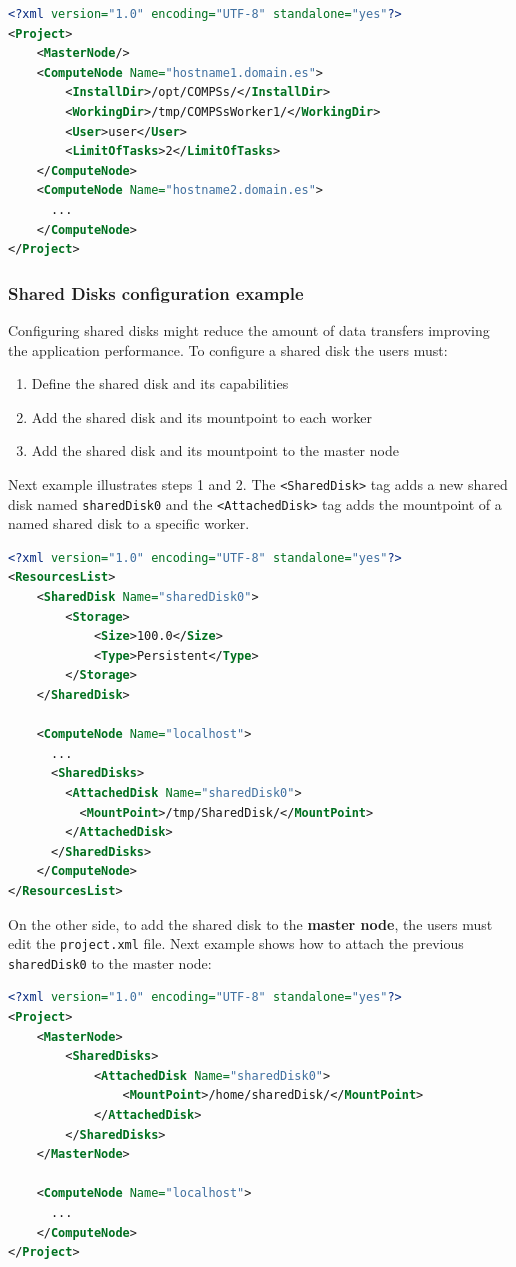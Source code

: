 \begin{lstlisting}[language=xml]
<?xml version="1.0" encoding="UTF-8" standalone="yes"?>                                                                                                                                                            
<Project>
    <MasterNode/>
    <ComputeNode Name="hostname1.domain.es">
        <InstallDir>/opt/COMPSs/</InstallDir>
        <WorkingDir>/tmp/COMPSsWorker1/</WorkingDir>
        <User>user</User>
        <LimitOfTasks>2</LimitOfTasks>
    </ComputeNode>
    <ComputeNode Name="hostname2.domain.es">
      ...
    </ComputeNode>
</Project>
\end{lstlisting}


\subsubsection{Shared Disks configuration example}
Configuring shared disks might reduce the amount of data transfers improving the application performance. To configure a 
shared disk the users must:
\begin{enumerate}
 \item Define the shared disk and its capabilities
 \item Add the shared disk and its mountpoint to each worker
 \item Add the shared disk and its mountpoint to the master node
\end{enumerate}

Next example illustrates steps 1 and 2. The \texttt{<SharedDisk>} tag adds a new shared disk named \texttt{sharedDisk0} and the
\texttt{<AttachedDisk>} tag adds the mountpoint of a named shared disk to a specific worker.
\begin{lstlisting}[language=xml]
<?xml version="1.0" encoding="UTF-8" standalone="yes"?>
<ResourcesList>
    <SharedDisk Name="sharedDisk0">
        <Storage>
            <Size>100.0</Size>
            <Type>Persistent</Type>
        </Storage>
    </SharedDisk>
    
    <ComputeNode Name="localhost">
      ...
      <SharedDisks>
        <AttachedDisk Name="sharedDisk0">
          <MountPoint>/tmp/SharedDisk/</MountPoint>
        </AttachedDisk>
      </SharedDisks>
    </ComputeNode>
</ResourcesList>
\end{lstlisting} 

On the other side, to add the shared disk to the \textbf{master node}, the users must edit the \texttt{project.xml} file. Next example shows how to attach the previous \texttt{sharedDisk0} to the master node:
\begin{lstlisting}[language=xml]
<?xml version="1.0" encoding="UTF-8" standalone="yes"?>
<Project>
    <MasterNode>
        <SharedDisks>
            <AttachedDisk Name="sharedDisk0">
                <MountPoint>/home/sharedDisk/</MountPoint>
            </AttachedDisk>
        </SharedDisks>
    </MasterNode>
    
    <ComputeNode Name="localhost">
      ...
    </ComputeNode>
</Project>
\end{lstlisting}

